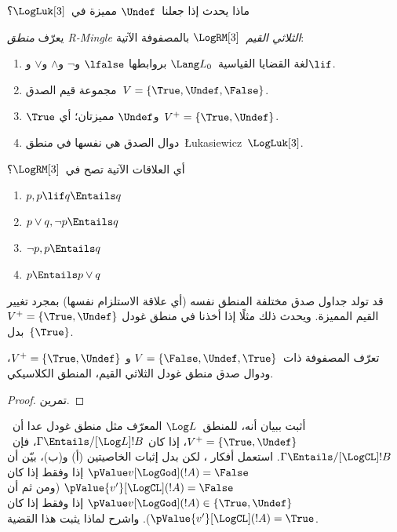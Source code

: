 \documentclass[../../../include/open-logic-section]{subfiles}
\begin{document}
ماذا يحدث إذا جعلنا~$\Undef$ مميزة في~$\LogLuk[3]$؟

\begin{defn}
  يعرّف \emph{منطق R-Mingle الثلاثي القيم}~$\LogRM[3]$ بالمصفوفة
  الآتية:
  \begin{enumerate}
    \item لغة القضايا القياسية~$\Lang L_0$ بروابطها
    $\lfalse$ و$\lnot$ و$\land$ و$\lor$ و$\lif$.
    \item مجموعة قيم الصدق~$V = \{\True, \Undef, \False\}$.
    \item $\True$ و$\Undef$ مميزتان؛ أي~$V^+ = \{\True, \Undef\}$.
    \item دوال الصدق هي نفسها في منطق~\L ukasiewicz~$\LogLuk[3]$.
  \end{enumerate}
\end{defn}

\begin{prob}
  أي العلاقات الآتية تصح في~$\LogRM[3]$؟
  \begin{enumerate}
    \item $p, p \lif q \Entails q$
    \item $p \lor q, \lnot p \Entails q$
    \item $\lnot p, p \Entails q$
    \item $p \Entails p \lor q$
  \end{enumerate}
\end{prob}

قد تولد جداول صدق مختلفة المنطق نفسه (أي علاقة الاستلزام نفسها) بمجرد
تغيير القيم المميزة. ويحدث ذلك مثلًا إذا أخذنا في منطق غودل
$V^+ = \{\True, \Undef\}$ بدل~$\{\True\}$.

\begin{prop}
  تعرّف المصفوفة ذات~$V = \{\False, \Undef,\True\}$ و
  $V^+=\{\True, \Undef\}$، ودوال صدق منطق غودل الثلاثي القيم، المنطق
  الكلاسيكي.
\end{prop}

\begin{proof}
  تمرين.
\end{proof}

\begin{prob}
  أثبت  ببيان أنه، للمنطق~$\Log L$
  المعرّف مثل منطق غودل عدا أن~$V^+=\{\True,\Undef\}$، إذا كان
  $\Gamma \Entails/[\Log L] !B$، فإن~$\Gamma \Entails/[\LogCL] !B$.
  استعمل أفكار ، لكن بدل إثبات
  الخاصيتين (أ) و(ب)، بيّن أن
  $\pValue v[\LogGod](!A) = \False$ إذا وفقط إذا كان
  $\pValue {v'}[\LogCL](!A) = \False$ (ومن ثم أن
  $\pValue v[\LogGod](!A) \in \{\True,\Undef\}$ إذا وفقط إذا كان
  $\pValue {v'}[\LogCL](!A) = \True$). واشرح لماذا يثبت هذا القضية.
\end{prob}
\end{document}

